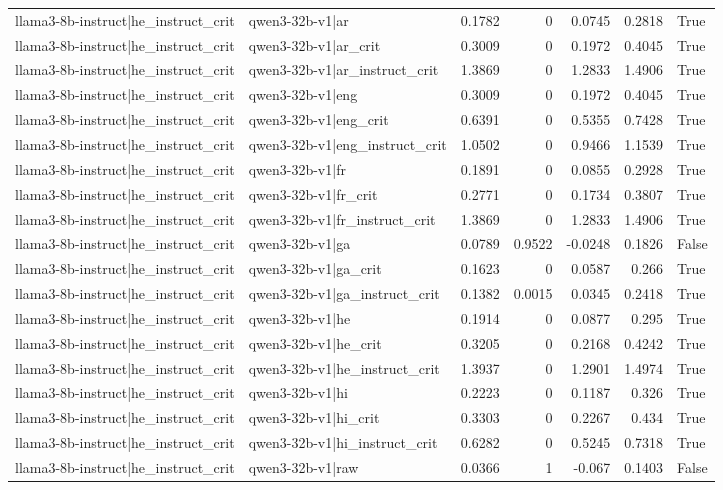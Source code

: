 \begin{table}
\begin{tabular}{l l r r r r l}
llama3-8b-instruct|he_instruct_crit & qwen3-32b-v1|ar & 0.1782 & 0 & 0.0745 & 0.2818 & True \\
llama3-8b-instruct|he_instruct_crit & qwen3-32b-v1|ar_crit & 0.3009 & 0 & 0.1972 & 0.4045 & True \\
llama3-8b-instruct|he_instruct_crit & qwen3-32b-v1|ar_instruct_crit & 1.3869 & 0 & 1.2833 & 1.4906 & True \\
llama3-8b-instruct|he_instruct_crit & qwen3-32b-v1|eng & 0.3009 & 0 & 0.1972 & 0.4045 & True \\
llama3-8b-instruct|he_instruct_crit & qwen3-32b-v1|eng_crit & 0.6391 & 0 & 0.5355 & 0.7428 & True \\
llama3-8b-instruct|he_instruct_crit & qwen3-32b-v1|eng_instruct_crit & 1.0502 & 0 & 0.9466 & 1.1539 & True \\
llama3-8b-instruct|he_instruct_crit & qwen3-32b-v1|fr & 0.1891 & 0 & 0.0855 & 0.2928 & True \\
llama3-8b-instruct|he_instruct_crit & qwen3-32b-v1|fr_crit & 0.2771 & 0 & 0.1734 & 0.3807 & True \\
llama3-8b-instruct|he_instruct_crit & qwen3-32b-v1|fr_instruct_crit & 1.3869 & 0 & 1.2833 & 1.4906 & True \\
llama3-8b-instruct|he_instruct_crit & qwen3-32b-v1|ga & 0.0789 & 0.9522 & -0.0248 & 0.1826 & False \\
llama3-8b-instruct|he_instruct_crit & qwen3-32b-v1|ga_crit & 0.1623 & 0 & 0.0587 & 0.266 & True \\
llama3-8b-instruct|he_instruct_crit & qwen3-32b-v1|ga_instruct_crit & 0.1382 & 0.0015 & 0.0345 & 0.2418 & True \\
llama3-8b-instruct|he_instruct_crit & qwen3-32b-v1|he & 0.1914 & 0 & 0.0877 & 0.295 & True \\
llama3-8b-instruct|he_instruct_crit & qwen3-32b-v1|he_crit & 0.3205 & 0 & 0.2168 & 0.4242 & True \\
llama3-8b-instruct|he_instruct_crit & qwen3-32b-v1|he_instruct_crit & 1.3937 & 0 & 1.2901 & 1.4974 & True \\
llama3-8b-instruct|he_instruct_crit & qwen3-32b-v1|hi & 0.2223 & 0 & 0.1187 & 0.326 & True \\
llama3-8b-instruct|he_instruct_crit & qwen3-32b-v1|hi_crit & 0.3303 & 0 & 0.2267 & 0.434 & True \\
llama3-8b-instruct|he_instruct_crit & qwen3-32b-v1|hi_instruct_crit & 0.6282 & 0 & 0.5245 & 0.7318 & True \\
llama3-8b-instruct|he_instruct_crit & qwen3-32b-v1|raw & 0.0366 & 1 & -0.067 & 0.1403 & False \\

\end{tabular}
\end{table}

